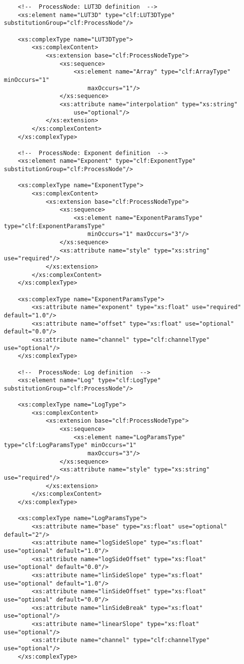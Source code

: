 \begin{lstlisting}
    <!--  ProcessNode: LUT3D definition  -->
    <xs:element name="LUT3D" type="clf:LUT3DType" substitutionGroup="clf:ProcessNode"/>
    
    <xs:complexType name="LUT3DType">
        <xs:complexContent>
            <xs:extension base="clf:ProcessNodeType">
                <xs:sequence>
                    <xs:element name="Array" type="clf:ArrayType" minOccurs="1" 
                        maxOccurs="1"/>
                </xs:sequence>
                <xs:attribute name="interpolation" type="xs:string" 
                    use="optional"/>
            </xs:extension>
        </xs:complexContent>
    </xs:complexType>
    
    <!--  ProcessNode: Exponent definition  -->
    <xs:element name="Exponent" type="clf:ExponentType" substitutionGroup="clf:ProcessNode"/>
    
    <xs:complexType name="ExponentType">
        <xs:complexContent>
            <xs:extension base="clf:ProcessNodeType">
                <xs:sequence>
                    <xs:element name="ExponentParamsType" type="clf:ExponentParamsType" 
                        minOccurs="1" maxOccurs="3"/>
                </xs:sequence>
                <xs:attribute name="style" type="xs:string" use="required"/>
            </xs:extension>
        </xs:complexContent>
    </xs:complexType>
    
    <xs:complexType name="ExponentParamsType">
        <xs:attribute name="exponent" type="xs:float" use="required" default="1.0"/>
        <xs:attribute name="offset" type="xs:float" use="optional" default="0.0"/>
        <xs:attribute name="channel" type="clf:channelType" use="optional"/>
    </xs:complexType>

    <!--  ProcessNode: Log definition  -->
    <xs:element name="Log" type="clf:LogType" substitutionGroup="clf:ProcessNode"/>
    
    <xs:complexType name="LogType">
        <xs:complexContent>
            <xs:extension base="clf:ProcessNodeType">
                <xs:sequence>
                    <xs:element name="LogParamsType" type="clf:LogParamsType" minOccurs="1" 
                        maxOccurs="3"/>
                </xs:sequence>                
                <xs:attribute name="style" type="xs:string" use="required"/>
            </xs:extension>
        </xs:complexContent>        
    </xs:complexType>

    <xs:complexType name="LogParamsType">
        <xs:attribute name="base" type="xs:float" use="optional" default="2"/>
        <xs:attribute name="logSideSlope" type="xs:float" use="optional" default="1.0"/>
        <xs:attribute name="logSideOffset" type="xs:float" use="optional" default="0.0"/>
        <xs:attribute name="linSideSlope" type="xs:float" use="optional" default="1.0"/>
        <xs:attribute name="linSideOffset" type="xs:float" use="optional" default="0.0"/>
        <xs:attribute name="linSideBreak" type="xs:float" use="optional"/>
        <xs:attribute name="linearSlope" type="xs:float" use="optional"/>
        <xs:attribute name="channel" type="clf:channelType" use="optional"/>
    </xs:complexType>
    

\end{lstlisting}
